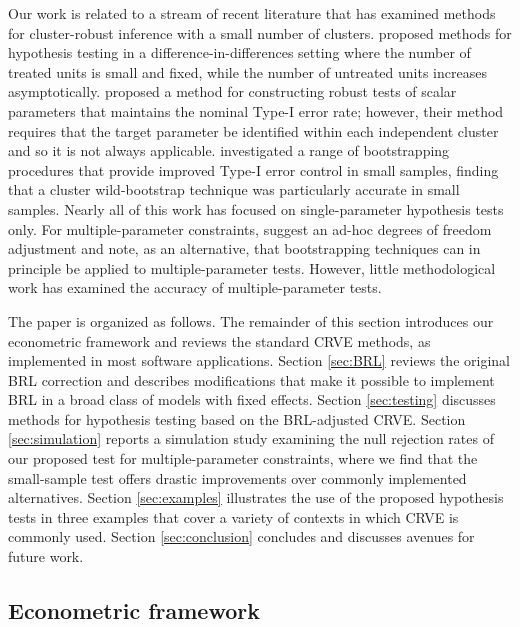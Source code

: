 \documentclass[12pt]{article}\usepackage[]{graphicx}\usepackage[]{color}
\begin{document}
Our work is related to a stream of recent literature that has examined methods for cluster-robust inference with a small number of clusters. 
\citet{Conley2011inference} proposed methods for hypothesis testing in a difference-in-differences setting where the number of treated units is small and fixed, while the number of untreated units increases asymptotically. 
\citet{Ibragimov2010tstatistic} proposed a method for constructing robust tests of scalar parameters that maintains the nominal Type-I error rate; however, their method requires that the target parameter be identified within each independent cluster and so it is not always applicable.  
\citet{Cameron2008bootstrap} investigated a range of bootstrapping procedures that provide improved Type-I error control in small samples, finding that a cluster wild-bootstrap technique was particularly accurate in small samples. 
Nearly all of this work has focused on single-parameter hypothesis tests only. 
For multiple-parameter constraints, \citet{Cameron2015practitioners} suggest an ad-hoc degrees of freedom adjustment and note, as an alternative, that bootstrapping techniques can in principle be applied to multiple-parameter tests. 
However, little methodological work has examined the accuracy of multiple-parameter tests.

The paper is organized as follows. The remainder of this section introduces our econometric framework and reviews the standard CRVE methods, as implemented in most software applications.
Section \ref{sec:BRL} reviews the original BRL correction and describes modifications that make it possible to implement BRL in a broad class of models with fixed effects.
Section \ref{sec:testing} discusses methods for hypothesis testing based on the BRL-adjusted CRVE. 
Section \ref{sec:simulation} reports a simulation study examining the null rejection rates of our proposed test for multiple-parameter constraints, where we find that the small-sample test offers drastic improvements over commonly implemented alternatives. 
Section \ref{sec:examples} illustrates the use of the proposed hypothesis tests in three examples that cover a variety of contexts in which CRVE is commonly used. 
Section \ref{sec:conclusion} concludes and discusses avenues for future work. 

\subsection{Econometric framework}
\end{document}
